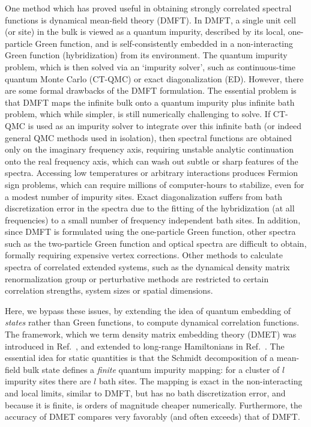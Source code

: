 \documentclass[aps,twocolumn,nobibnotes]{revtex4}
\begin{document}
One method which has proved useful in obtaining strongly correlated spectral functions is dynamical mean-field 
theory (DMFT)\cite{Georges1992,Georges1996,Kotliar2006}. In 
DMFT, a single unit cell (or site) in the bulk is viewed as a quantum impurity, described by its local, one-particle Green function,
and is self-consistently embedded in a non-interacting Green function (hybridization) from its environment.
The quantum impurity problem, which is then solved via an `impurity solver', such as
continuous-time quantum Monte Carlo (CT-QMC)\cite{Millis2006} or exact diagonalization (ED)\cite{Zgid2012}. 
However, there are some formal drawbacks of the DMFT formulation. 
The essential problem is that DMFT maps the infinite bulk onto a quantum impurity plus infinite bath problem, which while 
simpler, is still numerically challenging to solve.
If CT-QMC is used as an 
impurity solver to integrate over this infinite bath (or indeed general QMC methods used in isolation), then spectral 
functions are obtained only on the imaginary frequency 
axis, requiring unstable analytic continuation onto the real frequency axis, which can wash out subtle or sharp features of the 
spectra\cite{Millis2009}. Accessing low temperatures or arbitrary interactions produces Fermion sign problems, which can require millions
of computer-hours to stabilize, even for a modest number of impurity sites.
Exact diagonalization suffers from bath discretization error in the spectra due to the 
fitting of the hybridization (at all frequencies) to a small number of frequency independent bath sites\cite{Liebsch2012}. In addition, since DMFT
is formulated using the one-particle Green function, other spectra such as the two-particle Green function and optical spectra are 
difficult to obtain, formally requiring expensive vertex corrections\cite{Millis2012}. Other methods to calculate 
spectra of correlated extended systems, such as the dynamical density matrix renormalization group\cite{Jeckelmann2004} or perturbative
methods\cite{Senechal2000} are restricted to certain correlation strengths, system sizes or spatial dimensions.

Here, we bypass these issues, by extending the idea of quantum embedding of {\em states} rather than Green functions, to compute dynamical
correlation functions. The framework, which we term density matrix embedding theory (DMET) was introduced in 
Ref.~, and extended to long-range Hamiltonians in Ref.~. 
The essential idea for static quantities is that the Schmidt decomposition of a mean-field bulk state defines a {\em finite} quantum impurity mapping:
for a cluster of $l$ impurity sites there are $l$ bath sites. The mapping is exact in the non-interacting and local limits, similar to DMFT, but
has no bath discretization error, and because it is finite, is orders of magnitude cheaper numerically. Furthermore, the accuracy of DMET compares
very favorably (and often exceeds) that of DMFT.
\end{document}
